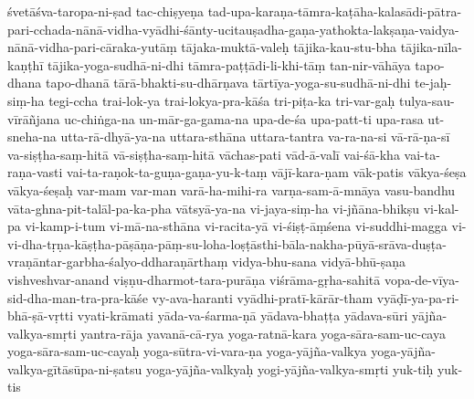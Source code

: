 {{śvetāśva-taropa-ni-ṣad
tac-chiṣyeṇa
tad-upa-karaṇa-tāmra-kaṭāha-kalasādi-pātra-pari-cchada-nānā-vidha-vyādhi-śānty-ucitauṣadha-gaṇa-yathokta-lakṣaṇa-vaidya-nānā-vidha-pari-cāraka-yutāṃ
tājaka-muktā-valeḥ
tājika-kau-stu-bha
tājika-nīla-kaṇṭhī
tājika-yoga-sudhā-ni-dhi
tāmra-paṭṭādi-li-khi-tāṃ
tan-nir-vāhāya
tapo-dhana
tapo-dhanā
tārā-bhakti-su-dhārṇava
tārtīya-yoga-su-sudhā-ni-dhi
te-jaḥ-siṃ-ha
tegi-ccha
trai-lok-ya
trai-lokya-pra-kāśa
tri-piṭa-ka
tri-var-gaḥ
tulya-sau-vīrāñjana
uc-chiṅga-na
un-mār-ga-gama-na
upa-de-śa
upa-patt-ti
upa-rasa
ut-sneha-na
utta-rā-dhyā-ya-na
uttara-sthāna
uttara-tantra
va-ra-na-si
vā-rā-ṇa-sī
va-siṣṭha-saṃ-hitā
vā-siṣṭha-saṃ-hitā
vāchas-pati
vād-ā-valī
vai-śā-kha
vai-ta-raṇa-vasti
vai-ta-raṇok-ta-guṇa-gaṇa-yu-k-taṃ
vājī-kara-ṇam
vāk-patis
vākya-śeṣa
vākya-śeṣaḥ
var-mam
var-man
varā-ha-mihi-ra
varṇa-sam-ā-mnāya
vasu-bandhu
vāta-ghna-pit-talāl-pa-ka-pha
vātsyā-ya-na
vi-jaya-siṃ-ha
vi-jñāna-bhikṣu
vi-kal-pa
vi-kamp-i-tum
vi-mā-na-sthāna
vi-racita-yā
vi-śiṣṭ-āṃśena
vi-suddhi-magga
vi-vi-dha-tṛṇa-kāṣṭha-pāṣāṇa-pāṃ-su-loha-loṣṭāsthi-bāla-nakha-pūyā-srāva-duṣṭa-vraṇāntar-garbha-śalyo-ddharaṇārthaṃ
vidya-bhu-sana
vidyā-bhū-ṣaṇa
vishveshvar-anand
viṣṇu-dharmot-tara-purāṇa
viśrāma-gṛha-sahitā
vopa-de-vīya-sid-dha-man-tra-pra-kāśe
vy-ava-haranti
vyādhi-pratī-kārār-tham
vyāḍī-ya-pa-ri-bhā-ṣā-vṛtti
vyati-krāmati
yāda-va-śarma-ṇā
yādava-bhaṭṭa
yādava-sūri
yājña-valkya-smṛti
yantra-rāja
yavanā-cā-rya
yoga-ratnā-kara
yoga-sāra-sam-uc-caya
yoga-sāra-sam-uc-cayaḥ
yoga-sūtra-vi-vara-ṇa
yoga-yājña-valkya
yoga-yājña-valkya-gītāsūpa-ni-ṣatsu
yoga-yājña-valkyaḥ
yogi-yājña-valkya-smṛti
yuk-tiḥ
yuk-tis
}}
\normalfontlatin%
\endinput

